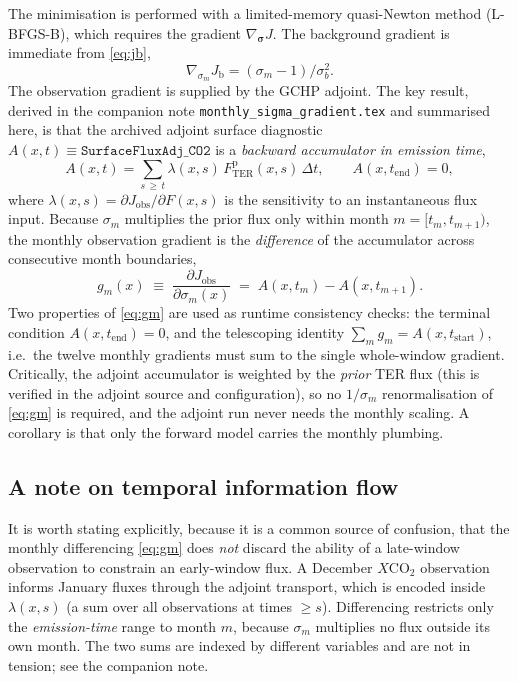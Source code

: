 \documentclass[12pt]{article}
\newcommand{\bm}[1]{\mathbf{#1}}
\newcommand{\xco}{X\mathrm{CO}_2}
\newcommand{\Fprior}{F^{\mathrm{p}}}
\newcommand{\tstart}{t_{\mathrm{start}}}
\newcommand{\tend}{t_{\mathrm{end}}}
\begin{document}
The minimisation is performed with a limited-memory quasi-Newton method
(L-BFGS-B), which requires the gradient $\nabla_{\bm{\sigma}} J$. The background
gradient is immediate from \eqref{eq:jb},
%
\begin{equation}
  \nabla_{\sigma_m} J_{\mathrm{b}} = (\sigma_m - 1)/\sigma_b^2 .
\end{equation}
%
The observation gradient is supplied by the GCHP adjoint. The key result, derived
in the companion note \texttt{monthly\_sigma\_gradient.tex} and summarised here,
is that the archived adjoint surface diagnostic $A(x,t) \equiv
\texttt{SurfaceFluxAdj\_CO2}$ is a \emph{backward accumulator in emission time},
%
\begin{equation}
  A(x,t) = \sum_{s\,\ge\,t} \lambda(x,s)\,\Fprior_{\mathrm{TER}}(x,s)\,\Delta t,
  \qquad A(x,\tend)=0,
  \label{eq:accum}
\end{equation}
%
where $\lambda(x,s) = \partial J_{\mathrm{obs}}/\partial F(x,s)$ is the
sensitivity to an instantaneous flux input. Because $\sigma_m$ multiplies the
prior flux only within month $m=[t_m,t_{m+1})$, the monthly observation gradient
is the \emph{difference} of the accumulator across consecutive month boundaries,
%
\begin{equation}
  \boxed{\;g_m(x) \;\equiv\; \frac{\partial J_{\mathrm{obs}}}{\partial \sigma_m(x)}
    \;=\; A(x,t_m) - A(x,t_{m+1}). \;}
  \label{eq:gm}
\end{equation}
%
Two properties of \eqref{eq:gm} are used as runtime consistency checks: the
terminal condition $A(x,\tend)=0$, and the telescoping identity $\sum_m g_m =
A(x,\tstart)$, i.e.\ the twelve monthly gradients must sum to the single
whole-window gradient. Critically, the adjoint accumulator is weighted by the
\emph{prior} TER flux (this is verified in the adjoint source and configuration),
so no $1/\sigma_m$ renormalisation of \eqref{eq:gm} is required, and the adjoint
run never needs the monthly scaling. A corollary is that only the forward model
carries the monthly plumbing.

\subsection{A note on temporal information flow}

It is worth stating explicitly, because it is a common source of confusion, that
the monthly differencing \eqref{eq:gm} does \emph{not} discard the ability of a
late-window observation to constrain an early-window flux. A December $\xco$
observation informs January fluxes through the adjoint transport, which is
encoded inside $\lambda(x,s)$ (a sum over all observations at times $\ge s$).
Differencing restricts only the \emph{emission-time} range to month $m$, because
$\sigma_m$ multiplies no flux outside its own month. The two sums are indexed by
different variables and are not in tension; see the companion note.
\end{document}
